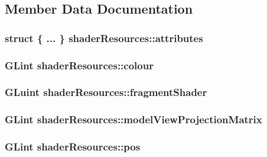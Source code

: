 \subsection{\-Member \-Data \-Documentation}
\hypertarget{structshader_resources_a00004b6567d1e7178a15842dd8325e42}{
\subsubsection[{attributes}]{\setlength{\rightskip}{0pt plus 5cm}struct \{ ... \}  {\bf shader\-Resources\-::attributes}}}
\label{structshader_resources_a00004b6567d1e7178a15842dd8325e42}
\hypertarget{structshader_resources_ade284e9d31dbb5d8ae20d48ca71d4803}{
\subsubsection[{colour}]{\setlength{\rightskip}{0pt plus 5cm}\-G\-Lint {\bf shader\-Resources\-::colour}}}
\label{structshader_resources_ade284e9d31dbb5d8ae20d48ca71d4803}
\hypertarget{structshader_resources_a7f7c50ec931e8313fa125a12aec1de52}{
\subsubsection[{fragment\-Shader}]{\setlength{\rightskip}{0pt plus 5cm}\-G\-Luint {\bf shader\-Resources\-::fragment\-Shader}}}
\label{structshader_resources_a7f7c50ec931e8313fa125a12aec1de52}
\hypertarget{structshader_resources_a25bf9d04069cd045b8fcd4483b25ccf5}{
\subsubsection[{model\-View\-Projection\-Matrix}]{\setlength{\rightskip}{0pt plus 5cm}\-G\-Lint {\bf shader\-Resources\-::model\-View\-Projection\-Matrix}}}
\label{structshader_resources_a25bf9d04069cd045b8fcd4483b25ccf5}
\hypertarget{structshader_resources_a074cd8e5271a817d584c38e21a474ce2}{
\subsubsection[{pos}]{\setlength{\rightskip}{0pt plus 5cm}\-G\-Lint {\bf shader\-Resources\-::pos}}}
